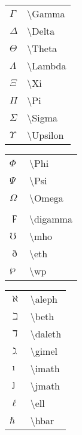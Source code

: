 \documentclass[14pt,a4paper]{extarticle}
\begin{document}
\begin{table}
  \begin{subtable}{.24\textwidth}
    \begin{tabular}{ p{1em} p{9em}  }

      $\Gamma$ & \textbackslash Gamma \\
      $\Delta$ & \textbackslash Delta \\
      $\Theta$ & \textbackslash Theta \\
      $\Lambda$ & \textbackslash Lambda \\
      $\Xi$ & \textbackslash Xi \\
      $\Pi$ & \textbackslash Pi \\
      $\Sigma$ & \textbackslash Sigma \\
      $\Upsilon$ & \textbackslash Upsilon 

    \end{tabular}
  \end{subtable}
  \begin{subtable}{.24\textwidth}
    \begin{tabular}{ p{1em} p{9em}  }

      $\Phi$ & \textbackslash Phi \\
      $\Psi$ & \textbackslash Psi \\
      $\Omega$ & \textbackslash Omega \\
      \\
      $\digamma$ & \textbackslash digamma \\
      $\mho$ & \textbackslash mho \\
      $\eth$ & \textbackslash eth \\
      $\wp$ & \textbackslash wp 

    \end{tabular}
  \end{subtable}
  \begin{subtable}{.24\textwidth}
    \begin{tabular}{ p{1em} p{9em}  }
  

 
      $\aleph$ & \textbackslash aleph \\
      $\beth$ & \textbackslash beth \\
      $\daleth$ & \textbackslash daleth \\
      $\gimel$ & \textbackslash gimel \\

      $\imath$ & \textbackslash imath \\
      $\jmath$ & \textbackslash jmath \\
      $\ell$ & \textbackslash ell \\
      $\hbar$ & \textbackslash hbar \\
      

\end{tabular}
\end{subtable}
\end{table}
\end{document}
